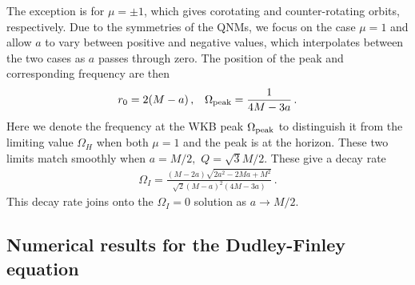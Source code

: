 \begin{refsection}
The exception is for $\mu = \pm 1$, which gives corotating and counter-rotating orbits, respectively. Due to the symmetries of the QNMs, we focus on the case $\mu = 1$ and allow $a$ to vary between positive and negative values, which interpolates between the two cases as $a$ passes through zero. The position of the peak and corresponding frequency are then
\begin{align}
\label{eq:WKBFreqOuterPeak}
r_0 = 2(M-a)\,, & & \Omega_{\rm peak} =  \frac{1}{4M-3a}\,. 
\end{align}
Here we denote the frequency at the WKB peak $\Omega_{\rm peak}$ to distinguish it from the limiting value $\Omega_H$ when both $\mu = 1$ and the peak is at the horizon. These two limits match smoothly when $a = M/2,$ $Q = \sqrt{3} M/2$.
These give a decay rate
\begin{align}
\label{eq:DMExDecay}
\Omega_I = \frac{(M-2a)\sqrt{2a^2-2Ma +M^2}}{\sqrt{2} (M-a)^2(4M-3a)}\,.
\end{align}
This decay rate joins onto the $\Omega_I = 0$ solution as $a \to M/2$.

\subsection{Numerical results for the Dudley-Finley equation}
\label{sec:DFNumerics}


\end{refsection}
